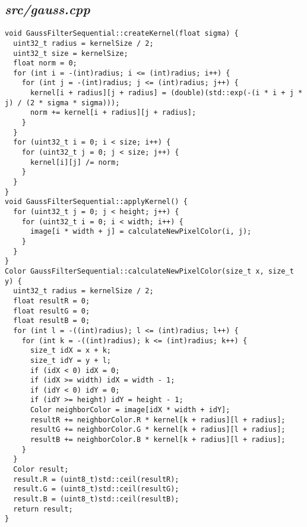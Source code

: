 \documentclass{article}
\begin{document}
\subsection*{\emph{src/gauss.cpp}}
\begin{lstlisting}
void GaussFilterSequential::createKernel(float sigma) {
  uint32_t radius = kernelSize / 2;
  uint32_t size = kernelSize;
  float norm = 0;
  for (int i = -(int)radius; i <= (int)radius; i++) {
    for (int j = -(int)radius; j <= (int)radius; j++) {
      kernel[i + radius][j + radius] = (double)(std::exp(-(i * i + j * j) / (2 * sigma * sigma)));
      norm += kernel[i + radius][j + radius];
    }
  }
  for (uint32_t i = 0; i < size; i++) {
    for (uint32_t j = 0; j < size; j++) {
      kernel[i][j] /= norm;
    }
  }
}
void GaussFilterSequential::applyKernel() {
  for (uint32_t j = 0; j < height; j++) {
    for (uint32_t i = 0; i < width; i++) {
      image[i * width + j] = calculateNewPixelColor(i, j);
    }
  }
}
Color GaussFilterSequential::calculateNewPixelColor(size_t x, size_t y) {
  uint32_t radius = kernelSize / 2;
  float resultR = 0;
  float resultG = 0;
  float resultB = 0;
  for (int l = -((int)radius); l <= (int)radius; l++) {
    for (int k = -((int)radius); k <= (int)radius; k++) {
      size_t idX = x + k;
      size_t idY = y + l;
      if (idX < 0) idX = 0;
      if (idX >= width) idX = width - 1;
      if (idY < 0) idY = 0;
      if (idY >= height) idY = height - 1;
      Color neighborColor = image[idX * width + idY];
      resultR += neighborColor.R * kernel[k + radius][l + radius];
      resultG += neighborColor.G * kernel[k + radius][l + radius];
      resultB += neighborColor.B * kernel[k + radius][l + radius];
    }
  }
  Color result;
  result.R = (uint8_t)std::ceil(resultR);
  result.G = (uint8_t)std::ceil(resultG);
  result.B = (uint8_t)std::ceil(resultB);
  return result;
}
\end{lstlisting}
\end{document}
